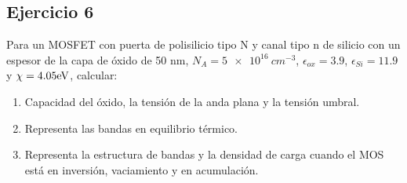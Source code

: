 \begin{Enunciado}
	\subsection*{Ejercicio 6}
	Para un MOSFET con puerta de polisilicio tipo N y canal tipo n de silicio con un espesor de la capa de óxido de 50 nm, $N_A = \SI{5e16}{cm^{-3}}$, $\epsilon_{ox}=3.9$, $\epsilon_{Si} = 11.9$ y $\chi=4.05 \text{eV}$, calcular:
	\begin{enumerate}[label=\alph*)]
		\item Capacidad del óxido, la tensión de la anda plana y la tensión umbral.
		\item Representa las bandas en equilibrio térmico.
		\item Representa la estructura de bandas y la densidad de carga cuando el MOS está en inversión, vaciamiento y en acumulación.
	\end{enumerate}
\end{Enunciado}

